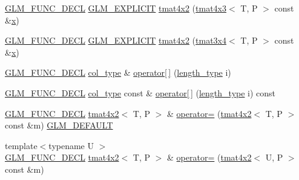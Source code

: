 \begin{DoxyCompactItemize}
\item 
\mbox{\hyperlink{setup_8hpp_ab2d052de21a70539923e9bcbf6e83a51}{G\+L\+M\+\_\+\+F\+U\+N\+C\+\_\+\+D\+E\+CL}} \mbox{\hyperlink{setup_8hpp_a6c74f5a5e7b134ab69023ff9a30d4d5d}{G\+L\+M\+\_\+\+E\+X\+P\+L\+I\+C\+IT}} \mbox{\hyperlink{structglm_1_1tmat4x2_abff28f46da0c6abed7b296042b5a55c3}{tmat4x2}} (\mbox{\hyperlink{structglm_1_1tmat4x3}{tmat4x3}}$<$ T, P $>$ const \&\mbox{\hyperlink{glad_8h_a92d0386e5c19fb81ea88c9f99644ab1d}{x}})
\item 
\mbox{\hyperlink{setup_8hpp_ab2d052de21a70539923e9bcbf6e83a51}{G\+L\+M\+\_\+\+F\+U\+N\+C\+\_\+\+D\+E\+CL}} \mbox{\hyperlink{setup_8hpp_a6c74f5a5e7b134ab69023ff9a30d4d5d}{G\+L\+M\+\_\+\+E\+X\+P\+L\+I\+C\+IT}} \mbox{\hyperlink{structglm_1_1tmat4x2_a5cf8d107788e7d1e366a6e4abdad0612}{tmat4x2}} (\mbox{\hyperlink{structglm_1_1tmat3x4}{tmat3x4}}$<$ T, P $>$ const \&\mbox{\hyperlink{glad_8h_a92d0386e5c19fb81ea88c9f99644ab1d}{x}})
\item 
\mbox{\hyperlink{setup_8hpp_ab2d052de21a70539923e9bcbf6e83a51}{G\+L\+M\+\_\+\+F\+U\+N\+C\+\_\+\+D\+E\+CL}} \mbox{\hyperlink{structglm_1_1tmat4x2_ac775231a890f4ea29cd0073670309b3a}{col\+\_\+type}} \& \mbox{\hyperlink{structglm_1_1tmat4x2_ac3af29ca90810fd2da26fec983a46821}{operator\mbox{[}$\,$\mbox{]}}} (\mbox{\hyperlink{structglm_1_1tmat4x2_a28aaf36ee36edef6715c1fae6874f530}{length\+\_\+type}} i)
\item 
\mbox{\hyperlink{setup_8hpp_ab2d052de21a70539923e9bcbf6e83a51}{G\+L\+M\+\_\+\+F\+U\+N\+C\+\_\+\+D\+E\+CL}} \mbox{\hyperlink{structglm_1_1tmat4x2_ac775231a890f4ea29cd0073670309b3a}{col\+\_\+type}} const  \& \mbox{\hyperlink{structglm_1_1tmat4x2_a9086b14e8e09c3674a2326d615595625}{operator\mbox{[}$\,$\mbox{]}}} (\mbox{\hyperlink{structglm_1_1tmat4x2_a28aaf36ee36edef6715c1fae6874f530}{length\+\_\+type}} i) const
\item 
\mbox{\hyperlink{setup_8hpp_ab2d052de21a70539923e9bcbf6e83a51}{G\+L\+M\+\_\+\+F\+U\+N\+C\+\_\+\+D\+E\+CL}} \mbox{\hyperlink{structglm_1_1tmat4x2}{tmat4x2}}$<$ T, P $>$ \& \mbox{\hyperlink{structglm_1_1tmat4x2_a46c78cffbef2b6300349830a76cb6372}{operator=}} (\mbox{\hyperlink{structglm_1_1tmat4x2}{tmat4x2}}$<$ T, P $>$ const \&m) \mbox{\hyperlink{setup_8hpp_aefce7051c376a64ba89fa93a9f63bc2c}{G\+L\+M\+\_\+\+D\+E\+F\+A\+U\+LT}}
\item 
{\footnotesize template$<$typename U $>$ }\\\mbox{\hyperlink{setup_8hpp_ab2d052de21a70539923e9bcbf6e83a51}{G\+L\+M\+\_\+\+F\+U\+N\+C\+\_\+\+D\+E\+CL}} \mbox{\hyperlink{structglm_1_1tmat4x2}{tmat4x2}}$<$ T, P $>$ \& \mbox{\hyperlink{structglm_1_1tmat4x2_adee2eef61ff69e7b17d001ae682e1a75}{operator=}} (\mbox{\hyperlink{structglm_1_1tmat4x2}{tmat4x2}}$<$ U, P $>$ const \&m)

\end{DoxyCompactItemize}
